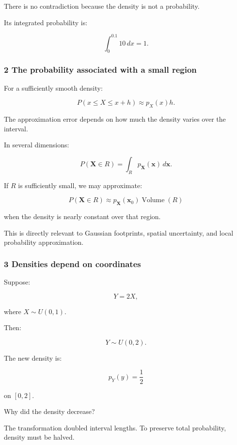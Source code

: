 There is no contradiction because the density is not a probability.

Its integrated probability is:

\[
 \int_0^{0.1}10\,dx=1.
\]

\subsubsection{2 The probability associated with a small region}\label{02-foundations-ii-ch023-the-probability-associated-with-a-small-region}

\hypertarget{02-foundations-ii-ch023-the-probability-associated-with-a-small-region}{}

For a sufficiently smooth density:

\[
 P(x\le X\le x+h) \approx p_X(x)h.
\]

The approximation error depends on how much the density varies over the interval.

In several dimensions:

\[
 P(\mathbf X\in R) = \int_Rp_{\mathbf X}(\mathbf x)\,d\mathbf x.
\]

If \(R\) is sufficiently small, we may approximate:

\[
 P(\mathbf X\in R) \approx p_{\mathbf X}(\mathbf x_0)\operatorname{Volume}(R)
\]

when the density is nearly constant over that region.

This is directly relevant to Gaussian footprints, spatial uncertainty, and local probability approximation.

\subsubsection{3 Densities depend on coordinates}\label{02-foundations-ii-ch023-densities-depend-on-coordinates}

\hypertarget{02-foundations-ii-ch023-densities-depend-on-coordinates}{}

Suppose:

\[
 Y=2X,
\]

where \(X\sim U(0,1)\).

Then:

\[
 Y\sim U(0,2).
\]

The new density is:

\[
 p_Y(y)=\frac12
\]

on \([0,2]\).

Why did the density decrease?

The transformation doubled interval lengths. To preserve total probability, density must be halved.

